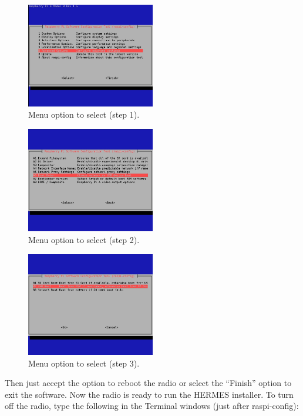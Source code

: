 \documentclass[11pt,a4paper]{article}
\begin{document}
\begin{figure}[H]
  \centering
  \includegraphics[width=0.5\textwidth]{pictures/screen4.jpg}
  \caption{Menu option to select (step 1).}
  \label{fig:screen4}
\end{figure}

\begin{figure}[H]
  \centering
  \includegraphics[width=0.5\textwidth]{pictures/screen5.jpg}
  \caption{Menu option to select (step 2).}
  \label{fig:screen5}
\end{figure}

\begin{figure}[H]
  \centering
  \includegraphics[width=0.5\textwidth]{pictures/screen6.jpg}
  \caption{Menu option to select (step 3).}
  \label{fig:screen6}
\end{figure}

Then just accept the option to reboot the radio or select the ``Finish'' option to exit the software.
Now the radio is ready to run the HERMES installer. To turn off the radio, type the following in the Terminal windows (just after raspi-config):
\end{document}
